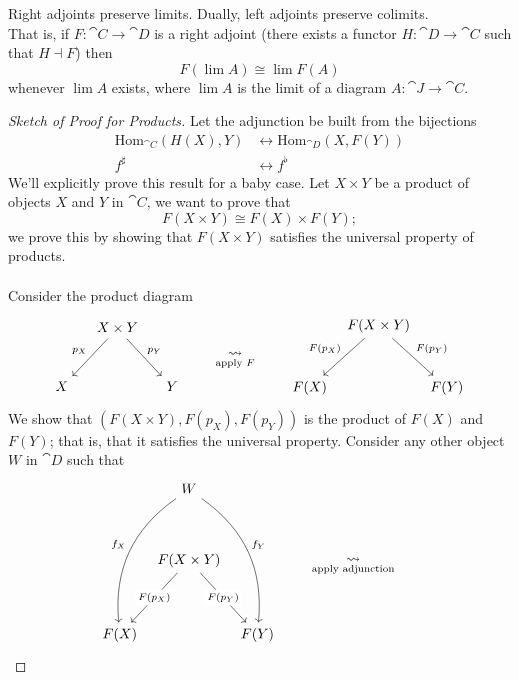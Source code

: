 \begin{theorem}[RAPL]\label{rapl}
Right adjoints preserve limits. Dually, left adjoints preserve colimits.\\[1em]
That is, if $F:\cat{C} \to \cat{D}$ is a right adjoint (there exists a functor $H:\cat{D} \to \cat{C}$ such that $H \dashv F$) then
\[F(\lim A) \cong \lim F(A)\]
whenever $\lim A$ exists, where $\lim A$ is the limit of a diagram $A:\cat{J} \to \cat{C}$.
\end{theorem}
\begin{proof}[Sketch of Proof for Products]
Let the adjunction be built from the bijections
\begin{align*}
\mathrm{Hom}_{\cat{C}}(H(X),Y) &\leftrightarrow \mathrm{Hom}_{\cat{D}}(X,F(Y))\\[0.5em]
f^\sharp &\leftrightarrow f^\flat
\end{align*}
We'll explicitly prove this result for a baby case. Let $X \times Y$ be a product of objects $X$ and $Y$ in $\cat{C}$, we want to prove that \[F(X \times Y) \cong F(X) \times F(Y);\]
we prove this by showing that $F(X \times Y)$ satisfies the universal property of products.\\
\\
Consider the product diagram
\[\begin{tikzcd}[row sep=large, column sep=small]
  & X\times Y \arrow[ld, "p_X"'] \arrow[rd, "p_Y"] &   \\
X &                                                & Y
\end{tikzcd}\qquad \underset{\text{apply $F$}}{\leadsto} \qquad
\begin{tikzcd}[row sep=large, column sep=tiny]
  & F(X\times Y) \arrow[ld, "F(p_X)"'] \arrow[rd, "F(p_Y)"] &   \\
F(X) &                                                & F(Y)
\end{tikzcd}\]
We show that $(F(X \times Y),F(p_X),F(p_Y))$ is the product of $F(X)$ and $F(Y)$; that is, that it satisfies the universal property. Consider any other object $W$ in $\cat{D}$ such that
\[\begin{tikzcd}[row sep=huge, column sep=tiny]
  & W \arrow[ldd, "f_X"', bend right] \arrow[rdd, "f_Y", bend left] &   \\
  & F(X\times Y) \arrow[ld, "F(p_X)"' description] \arrow[rd, "F(p_Y)" description]                  &   \\
F(X) &                                                                 & F(Y)
\end{tikzcd}\qquad \underset{\text{apply adjunction}}{\leadsto} \qquad
\]
\end{proof}
